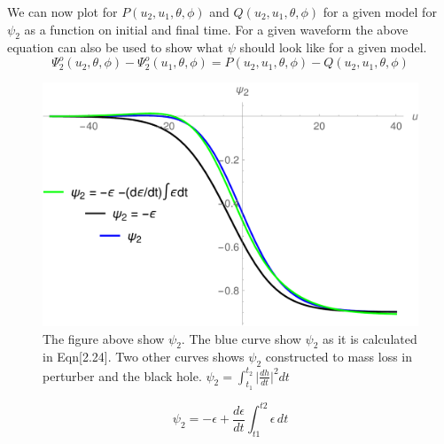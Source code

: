 \documentclass[prd,preprintnumbers,onecolumn,eqsecnum,floatfix,letter]{revtex4}
\begin{document}
 We can now plot for $P(u_2, u_1, \theta, \phi)$ and $Q(u_2, u_1, \theta, \phi)$ for a given model for $\psi_2$ as a function on initial and final time. For a given waveform the above equation can also be used to show what $\psi$ should look like for a given model. 	
 \begin{equation}
 	\Psi^{o}_{2}\left(u_2, \theta, \phi\right) - \Psi^{o}_{2}\left(u_1, \theta, \phi\right) = P(u_2, u_1, \theta, \phi) - Q(u_2, u_1, \theta, \phi)
 \end{equation}
\begin{figure}
	\includegraphics[width=5.5in]{../plots/BalanceLawTwosides.pdf}
	\caption{The figure above show $\psi_2$. The blue curve show $\psi_2$ as it is calculated in Eqn[2.24]. Two other curves shows $\psi_2$ constructed to mass loss in perturber and the black hole.
	$\psi_2 = \int_{t_1}^{t_2}\big|\frac{dh}{dt}\big|^{2}dt$ }
	\label{fig:RHSvsLHS}
\end{figure}
\begin{equation}
	\psi_{2} = -\epsilon + \frac{d\epsilon}{dt}\int_{t1}^{t2}\epsilon \,dt
\end{equation}
\end{document}

